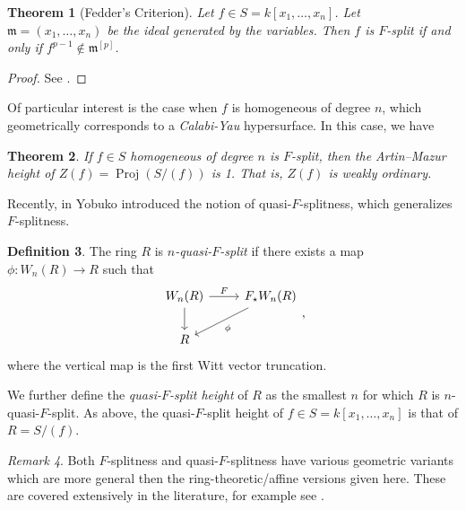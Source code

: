 \documentclass[a4paper]{article}
\newtheorem{thm}{Theorem}[section]
\theoremstyle{definition}
\newtheorem{defn}[thm]{Definition}
\theoremstyle{remark}
\newtheorem{rmk}[thm]{Remark}
\newcommand{\Proj}{\operatorname{Proj}}
\begin{document}
\begin{thm}
	[Fedder's Criterion]
    \label{thm:fedder:criterion}
	Let \(f \in S = k[x_{1}, \ldots, x_{n}]\).
	Let \(\mathfrak{m} = (x_{1}, \ldots, x_{n})\) 
	be the ideal generated by the variables.
	Then \(f\) is \(F\)-split if and only if 
	\(f^{p-1} \notin \mathfrak{m}^{[p]}\).
\end{thm}

\begin{proof}
	See \cite[Theorem~2.5]{ma-polstra-2021-F-sing-comm-alg}.
\end{proof}

Of particular interest is the case when \(f\) is 
homogeneous of degree \(n\), which geometrically
corresponds to a \textit{Calabi-Yau} hypersurface.
In this case, we have

\begin{thm}
	\label{thm:fsplit:ordinary}
	If \(f \in S\) 
	homogeneous of degree \(n\) 
	is \(F\)-split,
	then the Artin--Mazur height 
	of \(Z(f) = \Proj (S / (f))\) 
	is 1. That is, \(Z(f)\) is weakly ordinary.
\end{thm}

Recently, in \cite{yobuko-2019-qfs-calabi-yau}
Yobuko introduced the notion of 
quasi-\(F\)-splitness, which generalizes \(F\)-splitness.

\begin{defn}
	The ring \(R\) is \textit{\(n\)-quasi-\(F\)-split} if there exists
	a map \(\phi \colon W_{n}(R) \xrightarrow{} R\) such that
	\[
	\begin{tikzcd}
		W_{n}(R) \arrow{r}{F} \arrow{d}[swap]{} &
		F_{\star}W_{n}(R) \arrow{ld}{\phi} \\
	R 
	\end{tikzcd}
	,\]
	where the vertical map is the first Witt vector truncation.
\end{defn}

We further define the \textit{quasi-\(F\)-split height} of \(R\) as the smallest \(n\) 
for which \(R\) is \(n\)-quasi-\(F\)-split.
As above, the quasi-\(F\)-split height of 
\(f \in S = k[x_{1}, \ldots, x_{n}]\) is that
of \(R = S / (f)\).

\begin{rmk}
	Both \(F\)-splitness and quasi-\(F\)-splitness have 
	various geometric
	variants which are more general then the 
	ring-theoretic/affine versions given here. 
	These are covered extensively in the literature, for example
	see \cite{kttwyy-2022-qfs-birat}.
\end{rmk}
\end{document}
